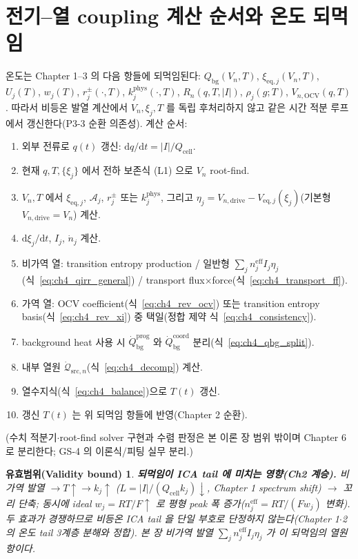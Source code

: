 \documentclass[11pt,a4paper]{article}
\newtheorem*{boundbox}{유효범위(Validity bound)}
\newcommand{\dd}{\mathrm{d}}
\newcommand{\eff}{\mathrm{eff}}
\newcommand{\eq}{\mathrm{eq}}
\newcommand{\drive}{\mathrm{drive}}
\newcommand{\bg}{\mathrm{bg}}
\newcommand{\cell}{\mathrm{cell}}
\newcommand{\OCV}{\mathrm{OCV}}
\newcommand{\src}{\mathrm{src}}
\newcommand{\prog}{\mathrm{prog}}
\newcommand{\coord}{\mathrm{coord}}
\begin{document}
\section{전기--열 coupling 계산 순서와 온도 되먹임}\label{sec:ch4_order}
온도는 Chapter 1--3 의 다음 항들에 되먹임된다: $Q_\bg(V_n,T)$, $\xi_{\eq,j}(V_n,T)$, $U_j(T)$, $w_j(T)$,
$r_j^\pm(\cdot,T)$, $k_j^{\mathrm{phys}}(\cdot,T)$, $R_n(q,T,|I|)$, $\rho_j(g;T)$, $V_{n,\OCV}(q,T)$. 따라서
비등온 발열 계산에서 $V_n,\xi_j,T$ 를 독립 후처리하지 않고 같은 시간 적분 루프에서 갱신한다(P3-3 순환 의존성).
계산 순서:
\begin{enumerate}[label=\arabic*),leftmargin=2.0em]
\item 외부 전류로 $q(t)$ 갱신: $\dd q/\dd t=|I|/Q_\cell$.
\item 현재 $q,T,\{\xi_j\}$ 에서 전하 보존식 (L1) 으로 $V_n$ root-find.
\item $V_n,T$ 에서 $\xi_{\eq,j}$, $\mathcal A_j$, $r_j^\pm$ 또는 $k_j^{\mathrm{phys}}$, 그리고
  $\eta_j=V_{n,\drive}-V_{\eq,j}(\xi_j)$(기본형 $V_{n,\drive}=V_n$) 계산.
\item $\dd\xi_j/\dd t$, $I_j$, $\dot n_j$ 계산.
\item 비가역 열: transition entropy production / 일반형 $\sum_j n_j^{\eff}I_j\eta_j$(식~\eqref{eq:ch4_qirr_general})
  / transport flux$\times$force(식~\eqref{eq:ch4_transport_ff}).
\item 가역 열: OCV coefficient(식~\eqref{eq:ch4_rev_ocv}) 또는 transition entropy basis(식~\eqref{eq:ch4_rev_xi})
  중 택일(정합 제약 식~\eqref{eq:ch4_consistency}).
\item background heat 사용 시 $\dot Q_\bg^{\prog}$ 와 $\dot Q_\bg^{\coord}$ 분리(식~\eqref{eq:ch4_qbg_split}).
\item 내부 열원 $\dot{\mathcal Q}_{\src,n}$(식~\eqref{eq:ch4_decomp}) 계산.
\item 열수지식(식~\eqref{eq:ch4_balance})으로 $T(t)$ 갱신.
\item 갱신 $T(t)$ 는 위 되먹임 항들에 반영(Chapter 2 순환).
\end{enumerate}
(수치 적분기$\cdot$root-find solver 구현과 수렴 판정은 본 이론 장 범위 밖이며 Chapter 6 로 분리한다; GS-4 의
이론식/피팅 실무 분리.)
\begin{boundbox}
\textbf{되먹임이 ICA tail 에 미치는 영향(Ch2 계승).} 비가역 발열 $\to T\uparrow\to k_j\uparrow$
($L=|I|/(Q_\cell k_j)\downarrow$, Chapter 1 spectrum shift) $\to$ 꼬리 단축; 동시에 ideal $w_j=RT/F\uparrow$ 로
평형 peak 폭 증가($n_j^{\eff}=RT/(Fw_j)$ 변화). 두 효과가 경쟁하므로 비등온 ICA tail 을 단일 부호로 단정하지
않는다(Chapter 1$\cdot$2 의 온도 tail 3계층 분해와 정합). 본 장 비가역 발열 $\sum_j n_j^{\eff}I_j\eta_j$ 가
이 되먹임의 열원 항이다.
\end{boundbox}
\end{document}
